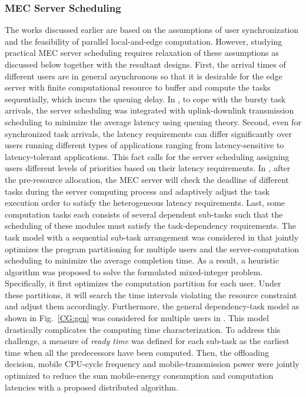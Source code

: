 \documentclass[journal]{IEEEtran}
\begin{document}
\subsubsection{\textbf{MEC Server Scheduling}}
The  works discussed earlier  \cite{you2016energy,barbarossa2013joint,hoang2012optimal,chen2015efficient,ma2015game,lyumulti:2016:ProxiCloud} are based on the assumptions of user synchronization and the feasibility of parallel local-and-edge computation. However, studying practical  MEC server scheduling requires relaxation of these assumptions as discussed below together with  the resultant designs.
First, the arrival times of different users are in general asynchronous so that it is desirable for the edge server with finite computational resource to buffer and compute the tasks sequentially, which incurs the queuing delay. In \cite{molina2014joint}, to cope with the bursty task arrivals, the server scheduling was integrated with uplink-downlink transmission scheduling to minimize the average latency using  queuing theory. Second, even for synchronized task arrivals, the latency requirements can differ significantly over  users running  different types of applications ranging from latency-sensitive to  latency-tolerant applications. This fact calls for the server  scheduling assigning users different levels of priorities based on their latency requirements.  In \cite{yu2016joint}, after the pre-resource allocation, the MEC server will check the deadline of different tasks during the server computing process and adaptively adjust the task execution order to satisfy the heterogeneous  latency requirements. Last, some computation tasks each consists of  several dependent sub-tasks such that the scheduling of these modules must satisfy the task-dependency requirements.  The task model with a sequential sub-task arrangement   was considered in\cite{yang2015multi} that  jointly optimizes the program partitioning for multiple users and the server-computation scheduling to minimize the average completion time. As a result, a heuristic algorithm was proposed to solve the formulated mixed-integer problem. Specifically, it first optimizes the computation partition for each user. Under these partitions, it will search the time intervals violating the resource constraint and adjust them accordingly. Furthermore, the general dependency-task model as shown in Fig.~\ref{CG:gen} was considered for multiple users in \cite{guo2016energy}. This model drastically complicates the computing time characterization. To address this challenge, a measure of \emph{ready time} was defined for each sub-task  as the earliest time when all the predecessors have been computed. Then, the offloading decision, mobile CPU-cycle frequency and mobile-transmission power were jointly optimized to reduce the sum mobile-energy consumption and computation latencies with a proposed distributed algorithm.
\end{document}
